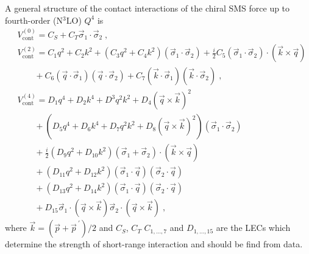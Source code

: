 A general structure of the contact interactions of the chiral SMS force up to fourth-order (N$^{3}$LO) $Q^{4}$ is 
\begin{equation}
\begin{split}
&V^{(0)}_{\mathrm{cont}} = C_{S} + C_{T}\vec{\sigma}_{1}\cdot\vec{\sigma}_{2}\;,\\
&V^{(2)}_{\mathrm{cont}} = C_{1}q^{2} + C_{2}k^{2} + \left(C_{3}q^{2} + C_{4}k^{2}\right)\left(\vec{\sigma}_{1}\cdot\vec{\sigma}_{2}\right) + \frac{i}{2}C_{5}\left(\vec{\sigma}_{1}\cdot\vec{\sigma}_{2}\right)\cdot\left(\vec{k}\times\vec{q}\right)\\
&~~~~~~~~~+ C_{6}\left(\vec{q}\cdot\vec{\sigma}_{1}\right)\left(\vec{q}\cdot\vec{\sigma}_{2}\right) + C_{7}\left(\vec{k}\cdot\vec{\sigma}_{1}\right)\left(\vec{k}\cdot\vec{\sigma}_{2}\right)\;,\\
&V^{(4)}_{\mathrm{cont}} = D_{1}q^{4} + D_{2}k^{4} + D^{3}q^{2}k^{2} + D_{4}\left(\vec{q}\times\vec{k}\right)^{2}\\
&~~~~~~~~~+\left(D_{5}q^{4} + D_{6}k^{4} + D_{7}q^{2}k^{2} + D_{8}\left(\vec{q}\times\vec{k}\right)^{2}\right)\left(\vec{\sigma}_{1}\cdot\vec{\sigma}_{2}\right)\\
&~~~~~~~~~+\frac{i}{2}\left(D_{9}q^{2} + D_{10}k^{2}\right)\left(\vec{\sigma}_{1} + \vec{\sigma}_{2}\right)\cdot\left(\vec{k}\times\vec{q}\right)\\
&~~~~~~~~~+\left(D_{11}q^{2} + D_{12}k^{2}\right)\left(\vec{\sigma}_{1}\cdot\vec{q}\right)\left(\vec{\sigma}_{2}\cdot\vec{q}\right)\\
&~~~~~~~~~+\left(D_{13}q^{2} + D_{14}k^{2}\right)\left(\vec{\sigma}_{1}\cdot\vec{q}\right)\left(\vec{\sigma}_{2}\cdot\vec{q}\right)\\
&~~~~~~~~~+D_{15}\vec{\sigma}_{1}\cdot\left(\vec{q}\times\vec{k}\right)\vec{\sigma}_{2}\cdot\left(\vec{q}\times\vec{k}\right)\;,
\end{split}
\end{equation}
where $\vec{k} = (\vec{p} + \vec{p}^{~\prime})/2$ and $C_{S}$, $C_{T}$ $C_{1,\ldots, 7}$ and $D_{1,\ldots, 15}$ are the LECs which determine the strength of short-range interaction and should be find from data. 

